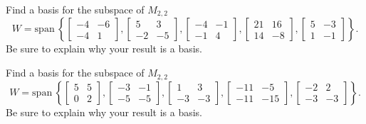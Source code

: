 \documentclass{article}
\begin{document}
\begin{exerciseStatement}
    Find a basis for the subspace of \(M_{2,2}\)
\[W=\mathrm{span}\ \left\{\left[\begin{array}{cc}
-4 & -6 \\
-4 & 1
\end{array}\right] , \left[\begin{array}{cc}
5 & 3 \\
-2 & -5
\end{array}\right] , \left[\begin{array}{cc}
-4 & -1 \\
-1 & 4
\end{array}\right] , \left[\begin{array}{cc}
21 & 16 \\
14 & -8
\end{array}\right] , \left[\begin{array}{cc}
5 & -3 \\
1 & -1
\end{array}\right]\right\}.\]
 Be sure to explain why your result is a basis.


  
\end{exerciseStatement}

\begin{exerciseStatement}
    Find a basis for the subspace of \(M_{2,2}\)
\[W=\mathrm{span}\ \left\{\left[\begin{array}{cc}
5 & 5 \\
0 & 2
\end{array}\right] , \left[\begin{array}{cc}
-3 & -1 \\
-5 & -5
\end{array}\right] , \left[\begin{array}{cc}
1 & 3 \\
-3 & -3
\end{array}\right] , \left[\begin{array}{cc}
-11 & -5 \\
-11 & -15
\end{array}\right] , \left[\begin{array}{cc}
-2 & 2 \\
-3 & -3
\end{array}\right]\right\}.\]
 Be sure to explain why your result is a basis.


  
\end{exerciseStatement}
\end{document}
